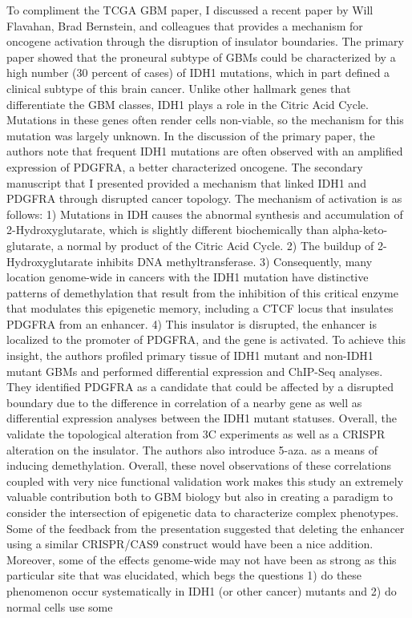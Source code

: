 \documentclass[12pt]{article}
\begin{document}
\begin{addmargin}[6.5mm]{4mm}  
To compliment the TCGA GBM paper, I discussed a recent paper by Will Flavahan, Brad Bernstein, and colleagues that provides a mechanism for oncogene activation through the disruption of insulator boundaries. The primary paper showed that the proneural subtype of GBMs could be characterized by a high number (30 percent of cases) of IDH1 mutations, which in part defined a clinical subtype of this brain cancer. Unlike other hallmark genes that differentiate the GBM classes, IDH1 plays a role in the Citric Acid Cycle. Mutations in these genes often render cells non-viable, so the mechanism for this mutation was largely unknown. In the discussion of the primary paper, the authors note that frequent IDH1 mutations are often observed with an amplified expression of PDGFRA, a better characterized oncogene. The secondary manuscript that I presented provided a mechanism that linked IDH1 and PDGFRA through disrupted cancer topology.  \newline \newline The mechanism of activation is as follows: 1) Mutations in IDH causes the abnormal synthesis and accumulation of 2-Hydroxyglutarate, which is slightly different biochemically than alpha-keto-glutarate, a normal by product of the Citric Acid Cycle. 2) The buildup of 2-Hydroxyglutarate inhibits DNA methyltransferase. 3) Consequently, many location genome-wide in cancers with the IDH1 mutation have distinctive patterns of demethylation that result from the inhibition of this critical enzyme that modulates this epigenetic memory, including a CTCF locus that insulates PDGFRA from an enhancer. 4) This insulator is disrupted, the enhancer is localized to the promoter of PDGFRA, and the gene is activated. \newline \newline To achieve this insight, the authors profiled primary tissue of IDH1 mutant and non-IDH1 mutant GBMs and performed differential expression and ChIP-Seq analyses. They identified PDGFRA as a candidate that could be affected by a disrupted boundary due to the difference in correlation of a nearby gene as well as differential expression analyses between the IDH1 mutant statuses. Overall, the validate the topological alteration from 3C experiments as well as a CRISPR alteration on the insulator. The authors also introduce 5-aza. as a means of inducing demethylation. Overall, these novel observations of these correlations coupled with very nice functional validation work makes this study an extremely valuable contribution both to GBM biology but also in creating a paradigm to consider the intersection of epigenetic data to characterize complex phenotypes.  \newline \newline Some of the feedback from the presentation suggested that deleting the enhancer using a similar CRISPR/CAS9 construct would have been a nice addition. Moreover, some of the effects genome-wide may not have been as strong as this particular site that was elucidated, which begs the questions 1) do these phenomenon occur systematically in IDH1 (or other cancer) mutants and 2) do normal cells use some 
\end{addmargin}
\end{document}
